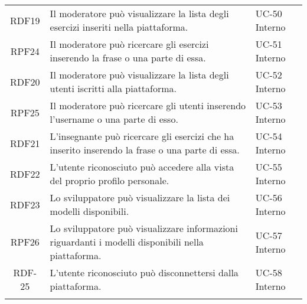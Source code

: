 \begin{tabularx}{\textwidth}{| c | p{10cm} | X |}
		RDF19 & Il moderatore può visualizzare la lista degli esercizi inseriti nella piattaforma. & UC-50 \newline Interno\\
		RPF24 & Il moderatore può ricercare gli esercizi inserendo la frase o una parte di essa. & UC-51 \newline Interno\\
		RDF20 & Il moderatore può visualizzare la lista degli utenti iscritti alla piattaforma. & UC-52 \newline Interno\\
		RPF25 & Il moderatore può ricercare gli utenti inserendo l'username o una parte di esso. & UC-53 \newline Interno\\
		RDF21 & L'insegnante può ricercare gli esercizi che ha inserito inserendo la frase o una parte di essa. & UC-54 \newline Interno\\
		RDF22 & L'utente riconosciuto può accedere alla vista del proprio profilo personale. & UC-55 \newline Interno\\
		RDF23 & Lo sviluppatore può visualizzare la lista dei modelli disponibili. & UC-56 \newline Interno\\
		RPF26 & Lo sviluppatore può visualizzare informazioni riguardanti i modelli disponibili nella piattaforma. & UC-57 \newline Interno\\
		RDF-25 & L'utente riconosciuto può disconnettersi dalla piattaforma. & UC-58 \newline Interno\\
		\hline
		\caption{Tabella dei requisiti funzionali}
\end{tabularx}

